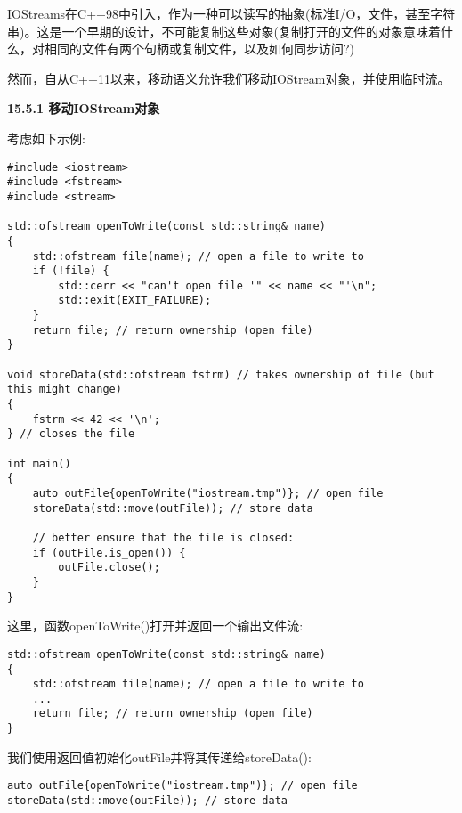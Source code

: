 IOStreams在C++98中引入，作为一种可以读写的抽象(标准I/O，文件，甚至字符串)。这是一个早期的设计，不可能复制这些对象(复制打开的文件的对象意味着什么，对相同的文件有两个句柄或复制文件，以及如何同步访问?)\par

然而，自从C++11以来，移动语义允许我们移动IOStream对象，并使用临时流。\par

\hspace*{\fill} \par %
\textbf{15.5.1 移动IOStream对象}

考虑如下示例:\par

{\color{red}{lib/outfile.cpp}}\par

\begin{lstlisting}[caption={}]
#include <iostream>
#include <fstream>
#include <stream>

std::ofstream openToWrite(const std::string& name)
{
	std::ofstream file(name); // open a file to write to
	if (!file) {
		std::cerr << "can't open file '" << name << "'\n";
		std::exit(EXIT_FAILURE);
	}
	return file; // return ownership (open file)
}

void storeData(std::ofstream fstrm) // takes ownership of file (but this might change)
{
	fstrm << 42 << '\n';
} // closes the file

int main()
{
	auto outFile{openToWrite("iostream.tmp")}; // open file
	storeData(std::move(outFile)); // store data
	
	// better ensure that the file is closed:
	if (outFile.is_open()) {
		outFile.close();
	}
}
\end{lstlisting}

这里，函数openToWrite()打开并返回一个输出文件流:\par

\begin{lstlisting}[caption={}]
std::ofstream openToWrite(const std::string& name)
{
	std::ofstream file(name); // open a file to write to
	...
	return file; // return ownership (open file)
}
\end{lstlisting}

我们使用返回值初始化outFile并将其传递给storeData():\par

\begin{lstlisting}[caption={}]
auto outFile{openToWrite("iostream.tmp")}; // open file
storeData(std::move(outFile)); // store data
\end{lstlisting}

